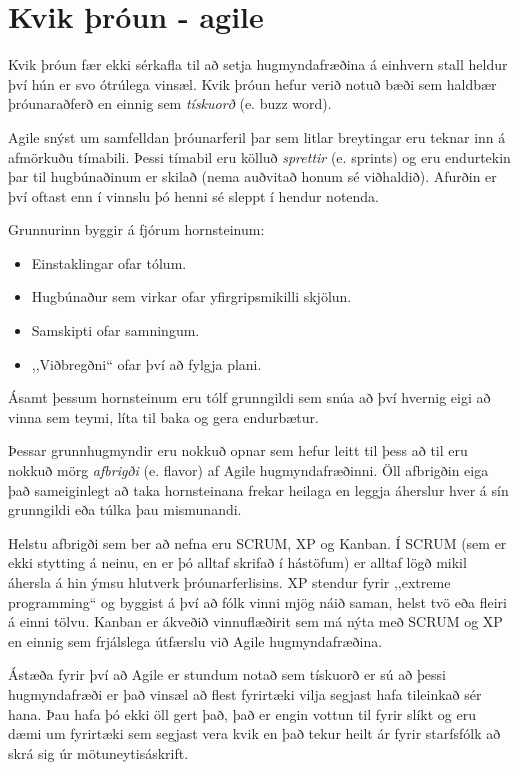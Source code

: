 \section{Kvik þróun - agile}
Kvik þróun fær ekki sérkafla til að setja hugmyndafræðina á einhvern stall heldur því hún er svo ótrúlega vinsæl.
Kvik þróun hefur verið notuð bæði sem haldbær þróunaraðferð en einnig sem \textit{tískuorð} (e. buzz word).

Agile snýst um samfelldan þróunarferil þar sem litlar breytingar eru teknar inn á afmörkuðu tímabili.
Þessi tímabil eru kölluð \textit{sprettir} (e. sprints) og eru endurtekin þar til hugbúnaðinum er skilað (nema auðvitað honum sé viðhaldið).
Afurðin er því oftast enn í vinnslu þó henni sé sleppt í hendur notenda.

Grunnurinn byggir á fjórum hornsteinum:
\begin{itemize}
	\item Einstaklingar ofar tólum.
	\item Hugbúnaður sem virkar ofar yfirgripsmikilli skjölun.
	\item Samskipti ofar samningum.
	\item ,,Viðbregðni“ ofar því að fylgja plani.
\end{itemize}

Ásamt þessum hornsteinum eru tólf grunngildi sem snúa að því hvernig eigi að vinna sem teymi, líta til baka og gera endurbætur.

Þessar grunnhugmyndir eru nokkuð opnar sem hefur leitt til þess að til eru nokkuð mörg \textit{afbrigði} (e. flavor) af Agile hugmyndafræðinni.
Öll afbrigðin eiga það sameiginlegt að taka hornsteinana frekar heilaga en leggja áherslur hver á sín grunngildi eða túlka þau mismunandi.

Helstu afbrigði sem ber að nefna eru SCRUM, XP og Kanban.
Í SCRUM (sem er ekki stytting á neinu, en er þó alltaf skrifað í hástöfum) er alltaf lögð mikil áhersla á hin ýmsu hlutverk þróunarferlisins.
XP stendur fyrir ,,extreme programming“ og byggist á því að fólk vinni mjög náið saman, helst tvö eða fleiri á einni tölvu.
Kanban er ákveðið vinnuflæðirit sem má nýta með SCRUM og XP en einnig sem frjálslega útfærslu við Agile hugmyndafræðina.

Ástæða fyrir því að Agile er stundum notað sem tískuorð er sú að þessi hugmyndafræði er það vinsæl að flest fyrirtæki vilja segjast hafa tileinkað sér hana.
Þau hafa þó ekki öll gert það, það er engin vottun til fyrir slíkt og eru dæmi um fyrirtæki sem segjast vera kvik en það tekur heilt ár fyrir starfsfólk að skrá sig úr mötuneytisáskrift.

